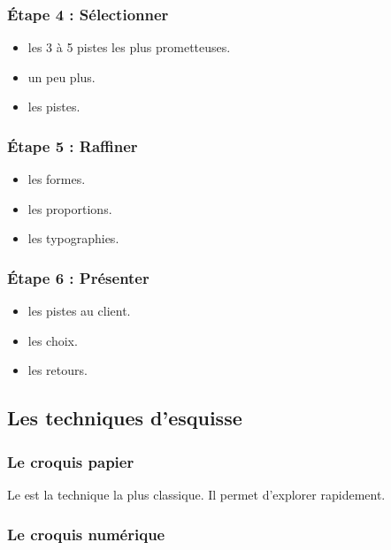 \subsubsection{Étape 4 : Sélectionner}

\begin{itemize}
    \item {} les 3 à 5 pistes les plus prometteuses.
    \item {} un peu plus.
    \item {} les pistes.
\end{itemize}

\subsubsection{Étape 5 : Raffiner}

\begin{itemize}
    \item {} les formes.
    \item {} les proportions.
    \item {} les typographies.
\end{itemize}

\subsubsection{Étape 6 : Présenter}

\begin{itemize}
    \item {} les pistes au client.
    \item {} les choix.
    \item {} les retours.
\end{itemize}

\subsection{Les techniques d'esquisse}

\subsubsection{Le croquis papier}

Le  est la technique la plus classique. Il permet d'explorer rapidement.

\subsubsection{Le croquis numérique}

